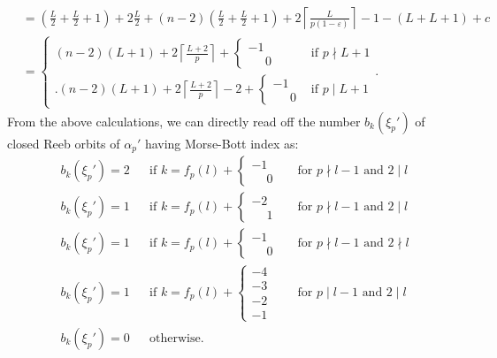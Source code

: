 \documentclass[a4paper,12pt,bibliography=totocnumbered,titlepage=false,abstracton,bookmarksnumbered=true]{scrartcl}
\newcommand{\veps}{\varepsilon}
\theoremstyle{definition}
\begin{document}
\begin{align*}
 &= \textstyle \left(\frac{L}{2}{+}\frac{L}{2}{+}1\right)+2\frac{L}{2}+(n{-}2)\left(\frac{L}{2}{+}\frac{L}{2}{+}1\right)+\textstyle 2\left\lceil\frac{L}{p(1-\veps)}\right\rceil -1-(L{+}L{+}1)+c\\
 &=\begin{cases}(n{-}2)(L{+}1)+2\left\lceil\frac{L+2}{p}\right\rceil + \left\lbrace\begin{smallmatrix}-1\\\phantom{\,-}0\end{smallmatrix}\right. &\text{if } p\nmid L{+}1\\
 \bigg.(n{-}2)(L{+}1)+2\left\lceil\frac{L+2}{p}\right\rceil-2 + \left\lbrace\begin{smallmatrix}-1\\\phantom{\,-}0\end{smallmatrix}\right. &\text{if } p\mid L{+}1\end{cases}.
\end{align*}
From the above calculations, we can directly read off the number $b_k(\xi_p')$ of closed Reeb orbits of $\alpha_p'$ having Morse-Bott index as:
\begin{align*}
 &b_k(\xi_p') = 2 && \text{if } k =f_p(l)+ \left\lbrace\begin{smallmatrix}-1\\\phantom{-}0\end{smallmatrix}\right. &&\text{for } p\nmid l{-}1 \text{ and } 2\mid l\\
 &b_k(\xi_p') = 1 && \text{if } k =f_p(l)+ \left\lbrace\begin{smallmatrix}-2\\\phantom{-}1\end{smallmatrix}\right. &&\text{for } p\nmid l{-}1 \text{ and } 2\mid l\\
 &b_k(\xi_p') = 1 && \text{if } k =f_p(l)+ \left\lbrace\begin{smallmatrix}-1\\\phantom{-}0\end{smallmatrix}\right. &&\text{for } p\nmid l{-}1 \text{ and } 2\nmid l\\
 &b_k(\xi_p') = 1 && \text{if } k =f_p(l)+ \left\lbrace\begin{smallmatrix} -4\\-3\\-2\\-1\end{smallmatrix}\right. &&\text{for } p\mid l{-}1 \text{ and } 2\mid l\\
 &b_k(\xi_p') = 0 && \text{otherwise}.
\end{align*}
\end{document}
